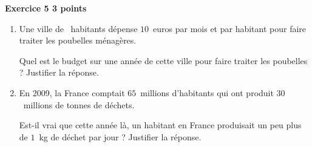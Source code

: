 \textbf{Exercice 5 \hfill 3 points}

\medskip

\begin{enumerate}
\item Une ville de ~habitants dépense $10$~euros par mois et par habitant pour faire traiter les poubelles ménagères.
 
Quel est le budget sur une année de cette ville pour faire traiter les poubelles ? Justifier la réponse. 
\item En 2009, la France comptait $65$~millions d'habitants qui ont produit $30$~millions de tonnes de déchets.
 
Est-il vrai que cette année là, un habitant en France produisait un peu plus de $1$~kg de déchet par jour ? Justifier la réponse. 
\end{enumerate}

\bigskip

